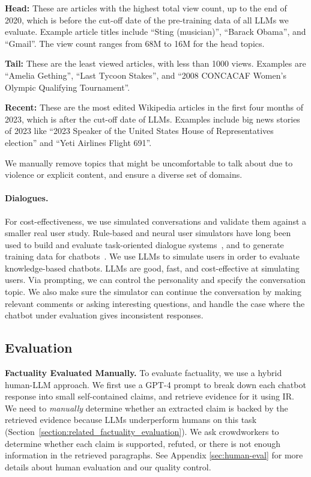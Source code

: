 \documentclass[11pt]{article}
\begin{document}
{\bf Head:} These are articles with the highest total view count, up to the end of 2020, which is before the cut-off date of the pre-training data of all LLMs we evaluate.
Example article titles include “Sting (musician)”, “Barack Obama”, and “Gmail”. The view count ranges from 68M to 16M for the head topics.

{\bf Tail:} These are the least viewed articles, with less than 1000 views. Examples are “Amelia Gething”, “Last Tycoon Stakes”, and “2008 CONCACAF Women's Olympic Qualifying Tournament”.

{\bf Recent:} These are the most edited Wikipedia articles in the first four months of 2023, which is after the cut-off date of LLMs. Examples include big news stories of 2023 like “2023 Speaker of the United States House of Representatives election” and “Yeti Airlines Flight 691”. 

We manually remove topics that might be uncomfortable to talk about due to violence or explicit content, and ensure a diverse set of domains.

\paragraph{Dialogues.} 
For cost-effectiveness, we use simulated conversations and validate them against a smaller real user study. 
\label{sec:user_simulator}
Rule-based and neural user simulators have long been used to build and evaluate task-oriented dialogue systems~\cite{schatzmann-etal-2005-quantitative, zhu-etal-2020-convlab, wan-etal-2022-unified}, and to generate training data for chatbots~\cite{bao-etal-2023-synthetic, zheng-etal-2023-augesc}. We use LLMs to simulate users in order to evaluate knowledge-based chatbots. LLMs are good, fast, and cost-effective at simulating users.
Via prompting, we can control the personality and specify the conversation topic. We also make sure the simulator
can continue the conversation by making relevant comments or asking interesting questions, and handle the case where the chatbot under evaluation gives inconsistent responses.

\subsection{Evaluation}
{\bf Factuality Evaluated Manually.}
\label{sec:factual-evaluation}
To evaluate factuality, we use a hybrid human-LLM approach. We first use a GPT-4 prompt to break down each chatbot response into small self-contained claims, and retrieve evidence for it using IR. We need to {\em manually} determine whether an extracted claim is backed by the retrieved evidence because LLMs underperform humans on this task (Section~\ref{section:related_factuality_evaluation}). We ask crowdworkers to determine whether each claim is supported, refuted, or there is not enough information in the retrieved paragraphs. See Appendix \ref{sec:human-eval} for more details about human evaluation and our quality control.
\end{document}
